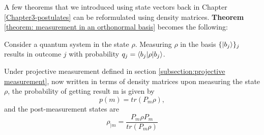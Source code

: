  

A few theorems that we introduced using state vectors back in Chapter \ref{Chapter3-postulates} can be reformulated using density matrices.
\textbf{Theorem} \ref{theorem: measurement in an orthonormal basis} becomes the following:
\begin{theorem} 
Consider a quantum system in the state $\rho$. Measuring $\rho$ in the basis $\{\ket{b_j}\}_j$ results in outcome $j$ with probability $q_j=\braket{b_j | \rho |b_j}$.
\end{theorem}

\bigskip
Under projective measurement defined in section \ref{subsection:projective measurement}, now written in terms of density matrices upon measuring the state $\rho$, the probability of getting result m is given by
\begin{equation}
    p(m)=tr(P_m \rho),
\end{equation}
and the post-measurement states are
\begin{equation}
    \rho_{|m}=\frac{P_m \rho P_m}{tr(P_m \rho)}
\end{equation}


